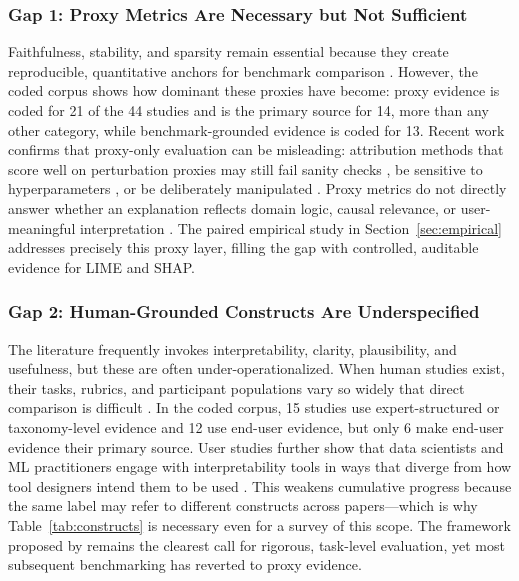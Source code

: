 \documentclass[fleqn,10pt,lineno]{wlpeerj}
\begin{document}
\subsubsection{Gap 1: Proxy Metrics Are Necessary but Not Sufficient}

Faithfulness, stability, and sparsity remain essential because they create
reproducible, quantitative anchors for benchmark comparison
\citep{agarwal2022openxai,hedstrom2023quantus,canha2025benchmark,
nauta2023anecdotal,burkart2021survey}. However, the coded corpus shows
how dominant these proxies have become: proxy evidence is coded for 21 of the
44 studies and is the primary source for 14, more than any other category,
while benchmark-grounded evidence is coded for 13. Recent work
confirms that proxy-only evaluation can be misleading: attribution
methods that score well on perturbation proxies may still fail sanity
checks \citep{adebayo2018sanity}, be sensitive to hyperparameters
\citep{alvarezmelis2018robustness}, or be deliberately manipulated
\citep{slack2020fooling}. Proxy metrics do not directly answer whether
an explanation reflects domain logic, causal relevance, or
user-meaningful interpretation \citep{kumar2020problems,
doshivelez2017rigorous}. The paired empirical study in
Section~\ref{sec:empirical} addresses precisely this proxy layer,
filling the gap with controlled, auditable evidence for LIME and SHAP.

\subsubsection{Gap 2: Human-Grounded Constructs Are Underspecified}

The literature frequently invokes interpretability, clarity, plausibility,
and usefulness, but these are often under-operationalized. When human
studies exist, their tasks, rubrics, and participant populations vary so
widely that direct comparison is difficult
\citep{ali2023trustworthy,longo2024manifesto,mohseni2021survey}. In the
coded corpus, 15 studies use expert-structured or taxonomy-level evidence and
12 use end-user evidence, but only 6 make end-user evidence their primary
source. User studies further show that data
scientists and ML practitioners engage with interpretability tools in ways
that diverge from how tool designers intend them to be used
\citep{kaur2020interpreting,hase2020evaluating,bucinca2020proxy}. This
weakens cumulative progress because the same label may refer to different
constructs across papers---which is why Table~\ref{tab:constructs} is
necessary even for a survey of this scope. The framework proposed by
\citet{doshivelez2017rigorous} remains the clearest call for rigorous,
task-level evaluation, yet most subsequent benchmarking has reverted to
proxy evidence.
\end{document}
